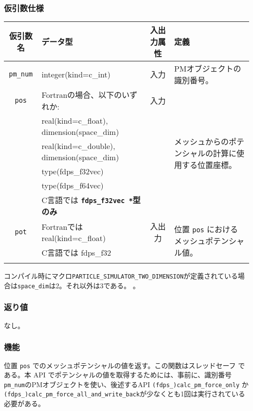 \subsubsection*{仮引数仕様}
\begin{table}[h]
\begin{tabularx}{\linewidth}{cp{8cm}cX}
\toprule
\rowcolor{Snow2}
仮引数名 & データ型 & 入出力属性 & 定義 \\
\midrule
\texttt{pm\_num} & integer(kind=c\_int) & 入力 & PMオブジェクトの識別番号。\\
\texttt{pos} & Fortranの場合、以下のいずれか: & 入力 & \multirow{6}{\hsize}{メッシュからのポテンシャルの計算に使用する位置座標。}\\
& real(kind=c\_float), dimension(space\_dim) &&\\
& real(kind=c\_double), dimension(space\_dim) &&\\
& type(fdps\_f32vec) &&\\
& type(fdps\_f64vec) &&\\
& C言語では \textbf{\texttt{fdps\_f32vec *}型のみ} &&\\
\texttt{pot} & Fortranでは real(kind=c\_float) & 入出力 & \multirow{3}{\hsize}{位置 \texttt{pos} におけるメッシュポテンシャル値。}\\
& C言語では fdps\_f32 &&\\
&&&\\
\bottomrule
\end{tabularx}
\end{table}
コンパイル時にマクロ\texttt{PARTICLE\_SIMULATOR\_TWO\_DIMENSION}が定義されている場合は\texttt{space\_dim}は2。それ以外は3である。
{\setnoko{}}。

\subsubsection*{返り値}
なし。

\subsubsection*{機能}
位置 \texttt{pos} でのメッシュポテンシャルの値を返す。この関数はスレッドセーフ である。本 API でポテンシャルの値を取得するためには、事前に、識別番号 \texttt{pm\_num}のPMオブジェクトを使い、後述するAPI \texttt{(fdps\_)calc\_pm\_force\_only} か \texttt{(fdps\_)calc\_pm\_force\_all\_and\_write\_back}が少なくとも1回は実行されている必要がある。
\clearpage

